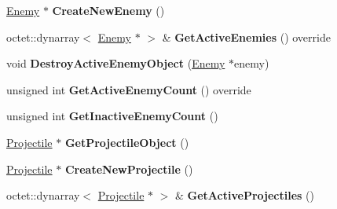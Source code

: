 \begin{DoxyCompactItemize}
\item 
\hypertarget{class_arena_1_1_object_pool_a7ae80096d179f4f8369cf500b40390ef}{\hyperlink{class_arena_1_1_enemy}{Enemy} $\ast$ {\bfseries Create\+New\+Enemy} ()}\label{class_arena_1_1_object_pool_a7ae80096d179f4f8369cf500b40390ef}

\item 
\hypertarget{class_arena_1_1_object_pool_a443c2b46a04f1c878e3593a18e780a90}{octet\+::dynarray$<$ \hyperlink{class_arena_1_1_enemy}{Enemy} $\ast$ $>$ \& {\bfseries Get\+Active\+Enemies} () override}\label{class_arena_1_1_object_pool_a443c2b46a04f1c878e3593a18e780a90}

\item 
\hypertarget{class_arena_1_1_object_pool_a4fa7d0286caaa1781ac8aaebd357defc}{void {\bfseries Destroy\+Active\+Enemy\+Object} (\hyperlink{class_arena_1_1_enemy}{Enemy} $\ast$enemy)}\label{class_arena_1_1_object_pool_a4fa7d0286caaa1781ac8aaebd357defc}

\item 
\hypertarget{class_arena_1_1_object_pool_ad7c5ee462b8eb881384eb9cf62ec88a7}{unsigned int {\bfseries Get\+Active\+Enemy\+Count} () override}\label{class_arena_1_1_object_pool_ad7c5ee462b8eb881384eb9cf62ec88a7}

\item 
\hypertarget{class_arena_1_1_object_pool_a9c10adf0227c85851ff11025010f04cb}{unsigned int {\bfseries Get\+Inactive\+Enemy\+Count} ()}\label{class_arena_1_1_object_pool_a9c10adf0227c85851ff11025010f04cb}

\item 
\hypertarget{class_arena_1_1_object_pool_aebd241ba5d68a4f3d625c1dedbc83dd6}{\hyperlink{class_arena_1_1_projectile}{Projectile} $\ast$ {\bfseries Get\+Projectile\+Object} ()}\label{class_arena_1_1_object_pool_aebd241ba5d68a4f3d625c1dedbc83dd6}

\item 
\hypertarget{class_arena_1_1_object_pool_ad689a6bbc0a7127febb8223ac803bf92}{\hyperlink{class_arena_1_1_projectile}{Projectile} $\ast$ {\bfseries Create\+New\+Projectile} ()}\label{class_arena_1_1_object_pool_ad689a6bbc0a7127febb8223ac803bf92}

\item 
\hypertarget{class_arena_1_1_object_pool_ae267be33855938f58987567f88306670}{octet\+::dynarray$<$ \hyperlink{class_arena_1_1_projectile}{Projectile} $\ast$ $>$ \& {\bfseries Get\+Active\+Projectiles} ()}\label{class_arena_1_1_object_pool_ae267be33855938f58987567f88306670}


\end{DoxyCompactItemize}
